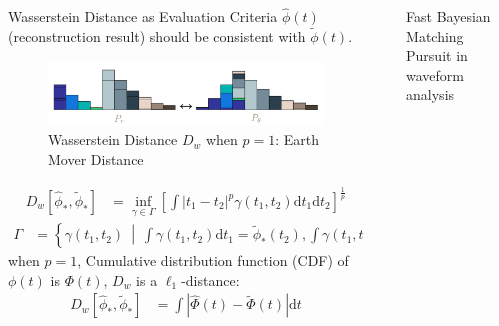 \documentclass[final]{beamer}
\newlength{\sepwidth}
\newlength{\colwidth}
\newcommand{\separatorcolumn}{\begin{column}{\sepwidth}\end{column}}
\begin{document}
\begin{frame}[t]
\begin{columns}[t]
\begin{column}{\colwidth}
\begin{block}{Wasserstein Distance\cite{villani_2009} as Evaluation Criteria}
    $\hat{\phi}(t)$ (reconstruction result) should be consistent with $\tilde{\phi}(t)$. 
    \begin{figure}
      \centering
      \includegraphics[width=0.5\linewidth]{img/WD.png}
      \caption{Wasserstein Distance $D_w$ when $p=1$: Earth Mover Distance}
    \end{figure}
    \begin{align*}
      D_w\left[\hat{\phi}_*, \tilde{\phi}_*\right] &= \inf_{\gamma \in \Gamma} \left[\int \left\vert t_1 - t_2 \right\vert^p \gamma(t_1, t_2)\mathrm{d}t_1\mathrm{d}t_2\right]^{\frac{1}{p}}
    \end{align*}
    \begin{align*}
      \Gamma &= \left\{\gamma(t_1, t_2) ~\middle\vert~ \int\gamma(t_1,t_2)\mathrm{d}t_1 = \tilde{\phi}_*(t_2) , \int\gamma(t_1,t_2)\mathrm{d}t_2 = \hat{\phi}_*(t_1) \right\}
    \end{align*}
    when $p=1$, Cumulative distribution function (CDF) of $\phi(t)$ is $\Phi(t)$, $D_w$ is a $\ell_1$-distance:
    \begin{align*}
      D_w\left[\hat{\phi}_*, \tilde{\phi}_*\right] &= \int\left|\hat{\Phi}(t) - \tilde{\Phi}(t)\right| \mathrm{d}t
    \end{align*}

  \end{block}

\end{column}

\separatorcolumn

\begin{column}{\colwidth}

  \begin{block}{Fast Bayesian Matching Pursuit\cite{schniter_fast_2008} in waveform analysis}


\end{block}
\end{column}
\end{columns}
\end{frame}
\end{document}
